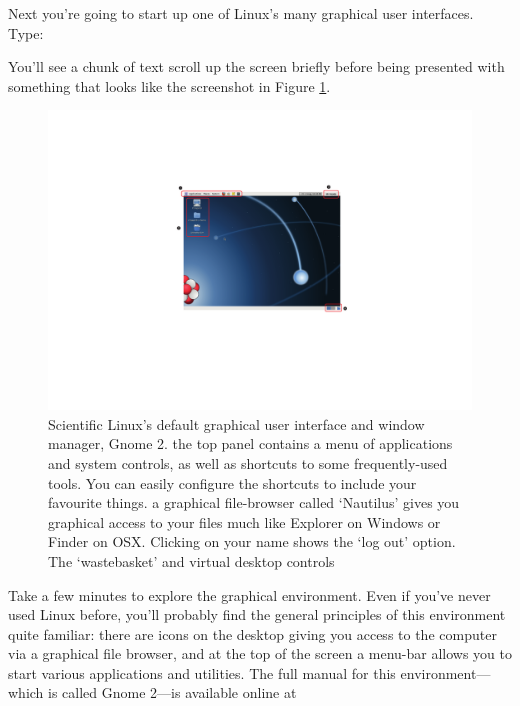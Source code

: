 Next you're going to start up one of Linux's many graphical user interfaces. Type:


You'll see a chunk of text scroll up the screen briefly before being presented with something that looks like the screenshot in Figure \ref{figure:gnome-desktop}.

\begin{figure}[t]
\centerline{\includegraphics[width=16cm]{images/gnome-desktop}}
\caption{Scientific Linux's default graphical user interface and
  window manager, Gnome 2. \protect{} the top panel contains
  a menu of applications and system controls, as well as shortcuts to
  some frequently-used tools. You can easily configure the shortcuts
  to include your favourite things. \protect{} a graphical
  file-browser called `Nautilus' gives you graphical access to your
  files much like Explorer on Windows or Finder on
  OSX. \protect{} Clicking on your name shows the `log out'
  option. \protect{} The `wastebasket' and virtual desktop
  controls}\label{figure:gnome-desktop}
\end{figure}

Take a few minutes to explore the graphical environment. Even if you've never used Linux before, you'll probably find the general principles of this environment quite familiar: there are icons on the desktop giving you access to the computer via a graphical file browser, and at the top of the screen a menu-bar allows you to start various applications and utilities. The full manual for this environment---which is called Gnome 2---is available online at 

